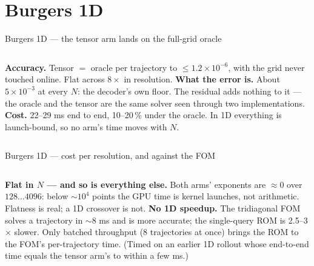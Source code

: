 \documentclass[10pt,aspectratio=169]{beamer}
\begin{document}
\section{Burgers 1D}

\begin{frame}{Burgers 1D --- the tensor arm lands on the full-grid oracle}
  \centering\scriptsize
  

  \vspace{2mm}
  \begin{columns}[T]
    \small
    \textbf{Accuracy.} Tensor $=$ oracle per trajectory to $\le 1.2\times10^{-6}$, with the grid never touched online. Flat across $8\times$ in resolution.
    \small
    \textbf{What the error is.} About $5\times10^{-3}$ at every $N$: the decoder's own floor. The residual adds nothing to it --- the oracle and the tensor are the same solver seen through two implementations.
    \small
    \textbf{Cost.} 22--29 ms end to end, 10--20\,\% under the oracle. In 1D everything is launch-bound, so no arm's time moves with $N$.
  \end{columns}
\end{frame}

\begin{frame}{Burgers 1D --- cost per resolution, and against the FOM}
  \begin{columns}[T]
    \centering\scriptsize
    
    \centering\scriptsize
    
  \end{columns}

  \vspace{3mm}
  \begin{columns}[T]
    \small
    \textbf{Flat in $N$ --- and so is everything else.} Both arms' exponents are $\approx 0$ over $128\ldots4096$: below $\sim 10^{4}$ points the GPU time is kernel launches, not arithmetic. Flatness is real; a 1D crossover is not.
    \small
    \textbf{No 1D speedup.} The tridiagonal FOM solves a trajectory in $\sim 8$ ms and is more accurate; the single-query ROM is 2.5--3$\times$ slower. Only batched throughput (8 trajectories at once) brings the ROM to the FOM's per-trajectory time. (Timed on an earlier 1D rollout whose end-to-end time equals the tensor arm's to within a few ms.)
  \end{columns}
\end{frame}
\end{document}
